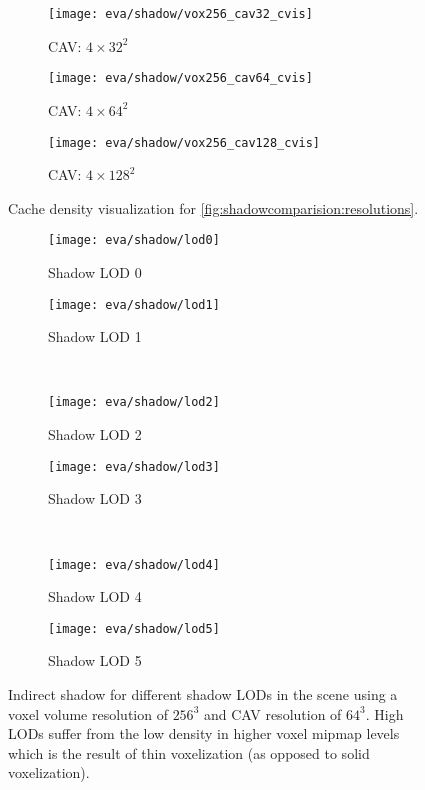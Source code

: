 \documentclass[thesis.tex]{subfiles}
\begin{document}
%
\begin{figure}
\centering
\begin{subfigure}[b]{0.27\textwidth}
\texttt{[image: eva/shadow/vox256\_cav32\_cvis]}
\caption{CAV: $4\times32^2$}
\end{subfigure}
\begin{subfigure}[b]{0.27\textwidth}
\texttt{[image: eva/shadow/vox256\_cav64\_cvis]}
\caption{CAV: $4\times64^2$}
\end{subfigure}
\begin{subfigure}[b]{0.27\textwidth}
\texttt{[image: eva/shadow/vox256\_cav128\_cvis]}
\caption{CAV: $4\times128^2$}
\end{subfigure}
\caption{Cache density visualization for \autoref{fig:shadowcomparision:resolutions}.}
\label{fig:shadowcomparision:resolutions:cavdensities}
\end{figure}
%
\begin{figure}
\begin{subfigure}[b]{\halfpageimage}
\texttt{[image: eva/shadow/lod0]}
\caption{Shadow LOD 0}
\end{subfigure}
\begin{subfigure}[b]{\halfpageimage}
\texttt{[image: eva/shadow/lod1]}
\caption{Shadow LOD 1}
\end{subfigure}
\\
\begin{subfigure}[b]{\halfpageimage}
\texttt{[image: eva/shadow/lod2]}
\caption{Shadow LOD 2}
\end{subfigure}
\begin{subfigure}[b]{\halfpageimage}
\texttt{[image: eva/shadow/lod3]}
\caption{Shadow LOD 3}
\end{subfigure}
\\
\begin{subfigure}[b]{\halfpageimage}
\texttt{[image: eva/shadow/lod4]}
\caption{Shadow LOD 4}
\end{subfigure}
\begin{subfigure}[b]{\halfpageimage}
\texttt{[image: eva/shadow/lod5]}
\caption{Shadow LOD 5}
\end{subfigure}
\caption{Indirect shadow for different shadow LODs in the  scene using a voxel volume resolution of $256^3$ and CAV resolution of $64^3$. High LODs suffer from the low density in higher voxel mipmap levels which is the result of thin voxelization (as opposed to solid voxelization). }
\label{fig:shadowcomparision:lod}
\end{figure}
%
\end{document}
